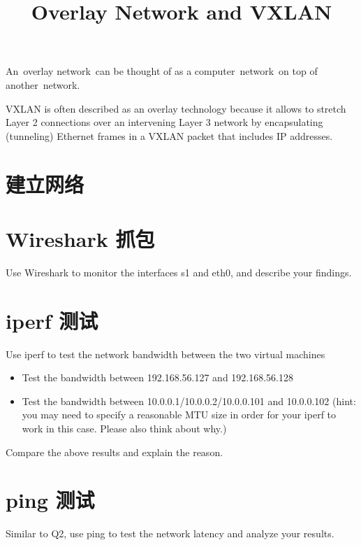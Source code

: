 \endofdump
{}

    \title{Overlay Network and VXLAN}
    \maketitle
    \tableofcontents
    \vfill
    An overlay network can be thought of as a computer network on top of another network. 

    VXLAN is often described as an overlay technology because it allows to stretch Layer 2 connections over an intervening Layer 3 network by encapsulating (tunneling) Ethernet frames in a VXLAN packet that includes IP addresses.
    \vfill
    \clearpage
    \section{建立网络}

    

    \section{Wireshark 抓包}
    Use Wireshark to monitor the interfaces s1 and eth0, and describe your findings.

    \section{iperf 测试}
    Use iperf to test the network bandwidth between the two virtual machines 
    \begin{itemize}
        \item Test the bandwidth between 192.168.56.127 and 192.168.56.128
        \item Test the bandwidth between 10.0.0.1/10.0.0.2/10.0.0.101 and 10.0.0.102 (hint: you may need to specify a reasonable MTU size in order for your iperf to work in this case. Please also think about why.)
    \end{itemize}

    Compare the above results and explain the reason. 

    \section{ping 测试}
    Similar to Q2, use ping to test the network latency and analyze your results.
    
